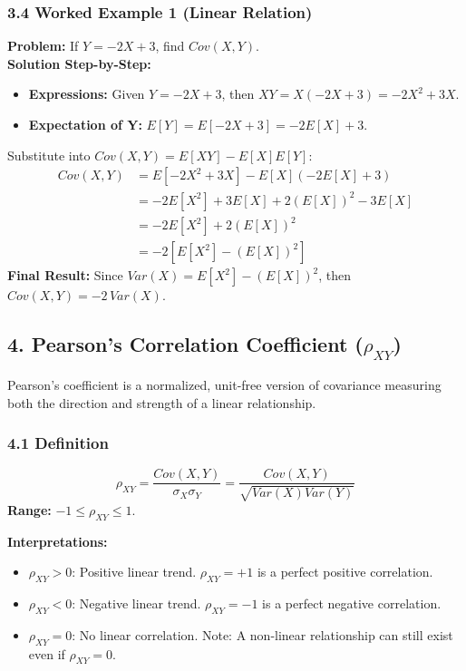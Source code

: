 \documentclass{article}
\begin{document}
\subsubsection*{3.4 Worked Example 1 (Linear Relation)}
\textbf{Problem:} If $Y = -2X + 3$, find $Cov(X,Y)$.\\
\textbf{Solution Step-by-Step:}
\begin{itemize}
    \item \textbf{Expressions:} Given $Y = -2X + 3$, then $XY = X(-2X + 3) = -2X^2 + 3X$.
    \item \textbf{Expectation of Y:} $E[Y] = E[-2X + 3] = -2E[X] + 3$.
\end{itemize}
Substitute into $Cov(X,Y) = E[XY] - E[X]E[Y]$:
\begin{align*}
Cov(X,Y) &= E[-2X^2 + 3X] - E[X](-2E[X] + 3) \\
&= -2E[X^2] + 3E[X] + 2(E[X])^2 - 3E[X] \\
&= -2E[X^2] + 2(E[X])^2 \\
&= -2[E[X^2] - (E[X])^2]
\end{align*}
\textbf{Final Result:} Since $Var(X) = E[X^2] - (E[X])^2$, then $Cov(X,Y) = -2 \, Var(X)$.

\subsection*{4. Pearson's Correlation Coefficient ($\rho_{XY}$)}
Pearson's coefficient is a normalized, unit-free version of covariance measuring both the direction and strength of a linear relationship.

\subsubsection*{4.1 Definition}
$$\rho_{XY} = \frac{Cov(X,Y)}{\sigma_{X}\sigma_{Y}} = \frac{Cov(X,Y)}{\sqrt{Var(X)Var(Y)}}$$
\textbf{Range:} $-1 \le \rho_{XY} \le 1$.

\textbf{Interpretations:}
\begin{itemize}
    \item $\rho_{XY} > 0$: Positive linear trend. $\rho_{XY} = +1$ is a perfect positive correlation.
    \item $\rho_{XY} < 0$: Negative linear trend. $\rho_{XY} = -1$ is a perfect negative correlation.
    \item $\rho_{XY} = 0$: No linear correlation. Note: A non-linear relationship can still exist even if $\rho_{XY} = 0$.
\end{itemize}
\end{document}
